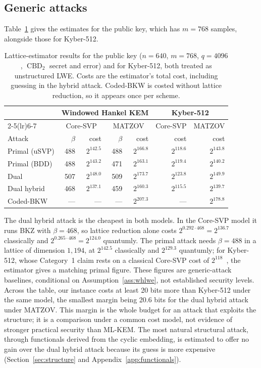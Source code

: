 \documentclass[11pt,a4paper]{article}
\theoremstyle{definition}
\newcommand{\CBD}{\operatorname{CBD}}
\begin{document}
\subsection{Generic attacks}
Table~\ref{tab:attacks} gives the estimates for the public key, which has $m = 768$ samples, alongside those for Kyber-512.

\begin{table}[H]
\centering
\small
\begin{tabular}{l rr rr rr}
\toprule
& \multicolumn{4}{c}{Windowed Hankel KEM} & \multicolumn{2}{c}{Kyber-512} \\
\cmidrule(lr){2-5}\cmidrule(lr){6-7}
& \multicolumn{2}{c}{Core-SVP} & \multicolumn{2}{c}{MATZOV} & Core-SVP & MATZOV \\
Attack & $\beta$ & cost & $\beta$ & cost & cost & cost \\
\midrule
Primal (uSVP)  & 488 & $2^{142.5}$ & 488 & $2^{166.8}$ & $2^{118.6}$ & $2^{143.8}$ \\
Primal (BDD)   & 488 & $2^{143.2}$ & 471 & $2^{163.1}$ & $2^{119.4}$ & $2^{140.2}$ \\
Dual           & 507 & $2^{148.0}$ & 509 & $2^{173.7}$ & $2^{123.8}$ & $2^{149.9}$ \\
Dual hybrid    & 468 & $2^{137.1}$ & 459 & $2^{160.3}$ & $2^{115.5}$ & $2^{139.7}$ \\
Coded-BKW      & --- & ---         & --- & $2^{207.3}$ & ---         & $2^{178.8}$ \\
\bottomrule
\end{tabular}
\caption{Lattice-estimator results for the public key ($n = 640$, $m = 768$, $q = 4096$, $\CBD_2$ secret and error) and for Kyber-512, both treated as unstructured LWE. Costs are the estimator's total cost, including guessing in the hybrid attack. Coded-BKW is costed without lattice reduction, so it appears once per scheme.}
\label{tab:attacks}
\end{table}

The dual hybrid attack is the cheapest in both models. In the Core-SVP model it runs BKZ with $\beta = 468$, so lattice reduction alone costs $2^{0.292 \cdot 468} = 2^{136.7}$ classically and $2^{0.265 \cdot 468} = 2^{124.0}$ quantumly. The primal attack needs $\beta = 488$ in a lattice of dimension $1{,}194$, at $2^{142.5}$ classically and $2^{129.3}$ quantumly; for Kyber-512, whose Category~1 claim rests on a classical Core-SVP cost of $2^{118}$~\cite{bos2018kyber}, the estimator gives a matching primal figure. These figures are generic-attack baselines, conditional on Assumption~\ref{ass:whlwe}, not established security levels. Across the table, our instance costs at least 20 bits more than Kyber-512 under the same model, the smallest margin being 20.6 bits for the dual hybrid attack under MATZOV. This margin is the whole budget for an attack that exploits the structure; it is a comparison under a common cost model, not evidence of stronger practical security than ML-KEM. The most natural structural attack, through functionals derived from the cyclic embedding, is estimated to offer no gain over the dual hybrid attack because its guess is more expensive (Section~\ref{sec:structure} and Appendix~\ref{app:functionals}).
\end{document}
